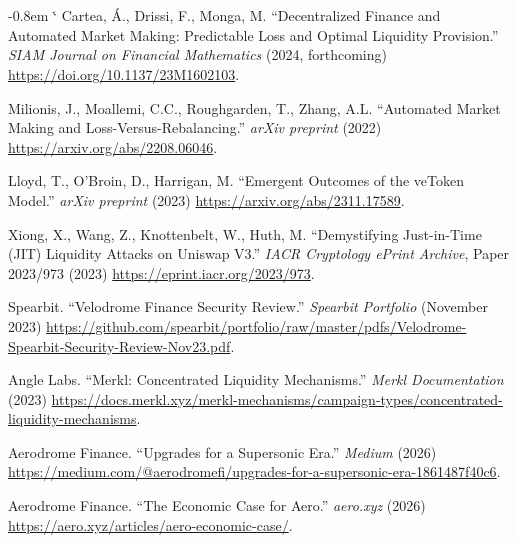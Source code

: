 \documentclass[11pt,a4paper]{article}
\makeatletter
\renewenvironment{thebibliography}[1]
  {\section*{\refname}%
   \fontsize{10pt}{12pt}\selectfont
   \list{\@biblabel{\@arabic\c@enumiv}}%
        {\settowidth\labelwidth{\@biblabel{#1}}%
         \leftmargin\labelwidth
         \advance\leftmargin-0.8em
         \advance\leftmargin\labelsep
         \setlength\itemindent{1em}%
         \setlength\itemsep{6pt plus 1pt minus 1pt}%
         \setlength\parsep{0pt}%
         \usecounter{enumiv}%
         \let\p@enumiv\@empty
         \renewcommand\theenumiv{\@arabic\c@enumiv}}%
   \sloppy\clubpenalty4000\widowpenalty4000\sfcode`\.\@m}
  {\def\@noitemerr{\@latex@warning{Empty `thebibliography' environment}}%
   \endlist}
\def\UrlBreakPenalty{10000}
\def\UrlBigBreakPenalty{10000}
\theoremstyle{definition}
\theoremstyle{plain}
\theoremstyle{remark}
\makeatother
\begin{document}
\begin{thebibliography}{9}
Cartea, \'A., Drissi, F., Monga, M. ``Decentralized Finance and Automated Market Making: Predictable Loss and Optimal Liquidity Provision.'' \emph{SIAM Journal on Financial Mathematics} (2024, forthcoming) \url{https://doi.org/10.1137/23M1602103}.

Milionis, J., Moallemi, C.C., Roughgarden, T., Zhang, A.L. ``Automated Market Making and Loss-Versus-Rebalancing.'' \emph{arXiv preprint} (2022) \url{https://arxiv.org/abs/2208.06046}.

Lloyd, T., O'Broin, D., Harrigan, M. ``Emergent Outcomes of the veToken Model.'' \emph{arXiv preprint} (2023) \url{https://arxiv.org/abs/2311.17589}.

Xiong, X., Wang, Z., Knottenbelt, W., Huth, M. ``Demystifying Just-in-Time (JIT) Liquidity Attacks on Uniswap V3.'' \emph{IACR Cryptology ePrint Archive}, Paper 2023/973 (2023) \url{https://eprint.iacr.org/2023/973}.

Spearbit. ``Velodrome Finance Security Review.'' \emph{Spearbit Portfolio} (November 2023) {\def\UrlBreakPenalty{100}\def\UrlBigBreakPenalty{100}\url{https://github.com/spearbit/portfolio/raw/master/pdfs/Velodrome-Spearbit-Security-Review-Nov23.pdf}}.%

Angle Labs. ``Merkl: Concentrated Liquidity Mechanisms.'' \emph{Merkl Documentation} (2023) {\def\UrlBreakPenalty{100}\def\UrlBigBreakPenalty{100}\url{https://docs.merkl.xyz/merkl-mechanisms/campaign-types/concentrated-liquidity-mechanisms}}.%

Aerodrome Finance. ``Upgrades for a Supersonic Era.'' \emph{Medium} (2026) \url{https://medium.com/@aerodromefi/upgrades-for-a-supersonic-era-1861487f40c6}.

Aerodrome Finance. ``The Economic Case for Aero.'' \emph{aero.xyz} (2026) \url{https://aero.xyz/articles/aero-economic-case/}.

\end{thebibliography}

\appendix
{}
\titlespacing*{\section}{0pt}{18pt}{8pt}
\end{document}
